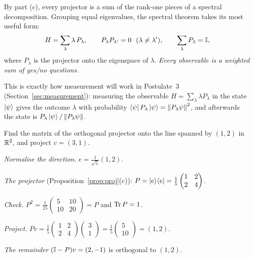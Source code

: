 By part (c), every projector is a sum of the rank-one pieces of a spectral decomposition. Grouping equal eigenvalues, the spectral theorem takes its most useful form:
\[
  H=\sum_\lambda\lambda\,P_\lambda,\qquad P_\lambda P_{\lambda'}=0\ \ (\lambda\neq\lambda'),\qquad\sum_\lambda P_\lambda=\mathbb{I},
\]
where $P_\lambda$ is the projector onto the eigenspace of $\lambda$. \emph{Every observable is a weighted sum of yes/no questions.}

\begin{xref}
  This is exactly how measurement will work in Postulate~3 (Section~\ref{sec:measurement}): measuring the observable $H=\sum_\lambda\lambda P_\lambda$ in the state $\left|\psi\right\rangle$ gives the outcome $\lambda$ with probability $\left\langle\psi\right| P_\lambda\left|\psi\right\rangle=\left\|P_\lambda\psi\right\|^2$, and afterwards the state is $P_\lambda\left|\psi\right\rangle/\left\|P_\lambda\psi\right\|$.
\end{xref}

\begin{example}\label{ex:proj-line}
  Find the matrix of the orthogonal projector onto the line spanned by $(1,2)$ in $\mathbb{R}^2$, and project $v=(3,1)$.
\end{example}
\begin{solution}
  \begin{steps}
    \item \emph{Normalise the direction.} $e=\frac1{\sqrt5}(1,2)$.
    \item \emph{The projector} (Proposition~\ref{prop:proj}(c)): $P=\left|e\right\rangle\!\left\langle e\right|=\tfrac15\begin{pmatrix}1&2\\2&4\end{pmatrix}$.
    \item \emph{Check.} $P^2=\tfrac1{25}\begin{pmatrix}5&10\\10&20\end{pmatrix}=P$ and $\operatorname{Tr} P=1$.
    \item \emph{Project.} $Pv=\tfrac15\begin{pmatrix}1&2\\2&4\end{pmatrix}\begin{pmatrix}3\\1\end{pmatrix}=\tfrac15\begin{pmatrix}5\\10\end{pmatrix}=(1,2)$.
    \item \emph{The remainder} $(\mathbb{I}-P)v=(2,-1)$ is orthogonal to $(1,2)$.
  \end{steps}
\end{solution}

